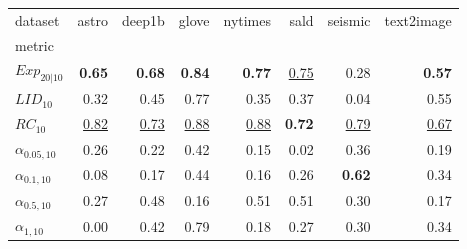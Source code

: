 \begin{tabular}{lrrrrrrr}
dataset & astro & deep1b & glove & nytimes & sald & seismic & text2image \\
metric &  &  &  &  &  &  &  \\
$Exp_{20|10}$ & \textbf{0.65} & \textbf{0.68} & \textbf{0.84} & \textbf{0.77} & \underline{0.75} & 0.28 & \textbf{0.57} \\
$LID_{10}$ & 0.32 & 0.45 & 0.77 & 0.35 & 0.37 & 0.04 & 0.55 \\
$RC_{10}$ & \underline{0.82} & \underline{0.73} & \underline{0.88} & \underline{0.88} & \textbf{0.72} & \underline{0.79} & \underline{0.67} \\
$\alpha_{0.05, 10}$ & 0.26 & 0.22 & 0.42 & 0.15 & 0.02 & 0.36 & 0.19 \\
$\alpha_{0.1, 10}$ & 0.08 & 0.17 & 0.44 & 0.16 & 0.26 & \textbf{0.62} & 0.34 \\
$\alpha_{0.5, 10}$ & 0.27 & 0.48 & 0.16 & 0.51 & 0.51 & 0.30 & 0.17 \\
$\alpha_{1, 10}$ & 0.00 & 0.42 & 0.79 & 0.18 & 0.27 & 0.30 & 0.34 \\
\end{tabular}
